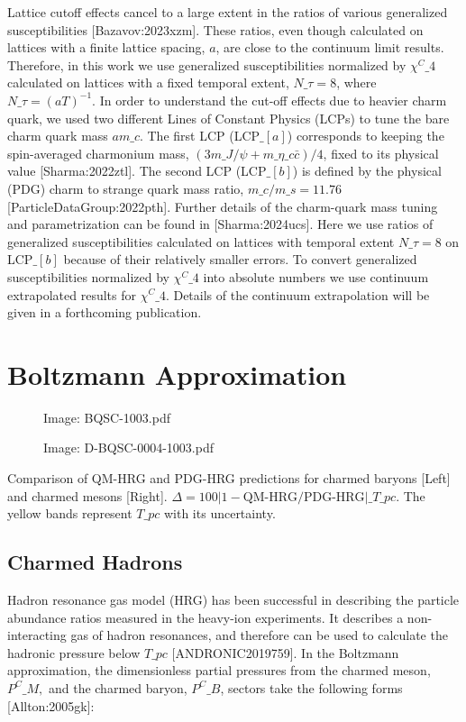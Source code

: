 \documentclass[11pt,a4paper]{article}
\begin{document}
Lattice cutoff effects cancel to a large extent in the ratios of various generalized susceptibilities  [Bazavov:2023xzm]. These ratios, even though calculated on lattices with a finite lattice spacing, $a$, are close to
the continuum limit results.  Therefore, in this work we use generalized susceptibilities normalized by $\chi^C\_4$ calculated on lattices with a fixed temporal extent, $N\_\tau=8$, where $N\_\tau=(aT)^{-1}$.   In order to understand the cut-off effects due to heavier charm quark, we used two different Lines of Constant Physics (LCPs) to tune the bare charm quark mass $am\_c$.  The first LCP (LCP$\_{[a]}$) corresponds to keeping the spin-averaged charmonium mass, ${(3m\_{J/\psi}+m\_{\eta\_{c\bar{c}}})/4}$, fixed to its physical value [Sharma:2022ztl]. The second LCP (LCP$\_{[b]}$)  is defined by the physical (PDG) charm to strange quark mass ratio, $m\_c/m\_s=11.76$ [ParticleDataGroup:2022pth].  Further details of the charm-quark mass tuning and parametrization can be found in [Sharma:2024ucs]. Here we use ratios of generalized susceptibilities calculated on lattices with temporal extent $N\_\tau=8$ on LCP$\_{[b]}$ because of their relatively smaller errors.  To convert generalized susceptibilities normalized by $\chi^C\_4$ into absolute numbers we use continuum extrapolated results for $\chi^C\_4$. Details of the continuum extrapolation will be given in a forthcoming  publication.

\section{Boltzmann Approximation}

\begin{figure}[h]
\caption{Image: BQSC-1003.pdf}
\end{figure}

\begin{figure}[h]
\caption{Image: D-BQSC-0004-1003.pdf}
\end{figure}

Comparison of QM-HRG and PDG-HRG predictions for charmed baryons [Left] and charmed mesons [Right]. $\Delta=100 |1-\text{QM-HRG}/\text{PDG-HRG}|\_{T\_{pc}}$. The yellow bands represent $T\_{pc}$ with its uncertainty.

\subsection{Charmed Hadrons}

Hadron resonance gas model (HRG) has been successful in describing the particle abundance ratios measured in the heavy-ion experiments. It describes a non-interacting gas of hadron resonances, and therefore can be used to calculate the hadronic pressure below ${T\_{pc}}$ [ANDRONIC2019759]. In the Boltzmann approximation, the dimensionless partial pressures from the charmed meson, ${P^C\_{M}},$  and the charmed baryon, ${P^C\_{B}}$, sectors take the following forms [Allton:2005gk]:
\end{document}
